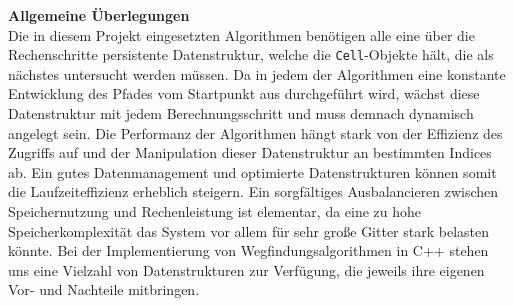 \textbf{Allgemeine Überlegungen}\\
Die in diesem Projekt eingesetzten Algorithmen benötigen alle eine über die Rechenschritte persistente Datenstruktur,
welche die \texttt{Cell}-Objekte hält, die als nächstes untersucht werden müssen.
Da in jedem der Algorithmen eine konstante Entwicklung des Pfades vom Startpunkt aus durchgeführt wird, wächst diese
Datenstruktur mit jedem Berechnungsschritt und muss demnach dynamisch angelegt sein.
Die Performanz der Algorithmen hängt stark von der Effizienz des Zugriffs auf und der Manipulation dieser Datenstruktur an bestimmten Indices ab.
Ein gutes Datenmanagement und optimierte Datenstrukturen können somit die Laufzeiteffizienz erheblich steigern.
Ein sorgfältiges Ausbalancieren zwischen Speichernutzung und Rechenleistung ist elementar, da eine zu hohe Speicherkomplexität
das System vor allem für sehr große Gitter stark belasten könnte.
Bei der Implementierung von Wegfindungsalgorithmen in C++ stehen uns eine Vielzahl von Datenstrukturen zur Verfügung,
die jeweils ihre eigenen Vor- und Nachteile mitbringen. \cite{iso2020}
\newpage

